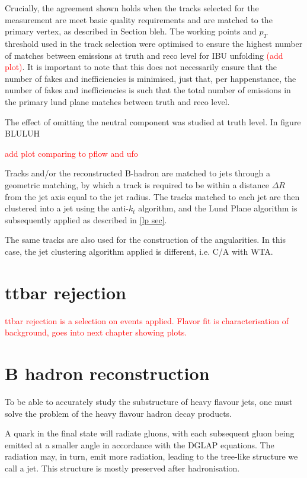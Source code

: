 \documentclass[10pt,a4paper]{book}
\newcommand{\todo}[1]{{\textcolor{red}{#1}}}
\begin{document}
Crucially, the agreement shown holds when the tracks selected for the measurement are meet basic quality requirements and are matched to the primary vertex, as described in Section bleh. The working points and $p_T$ threshold used in the track selection were optimised to ensure the highest number of matches between emissions at truth and reco level for IBU unfolding \todo{(add plot)}. It is important to note that this does not necessarily ensure that the number of fakes and inefficiencies is minimised, just that, per happenstance, the number of fakes and inefficiencies is such that the total number of emissions in the primary lund plane matches between truth and reco level.

The effect of omitting the neutral component was studied at truth level. In figure BLULUH 

\todo{add plot comparing to pflow and ufo}

Tracks and/or the reconstructed B-hadron are matched to jets through a geometric matching, by which a track is required to be within a distance $\Delta R$ from the jet axis equal to the jet radius. The tracks matched to each jet are then clustered into a jet using the anti-$k_t$ algorithm, and the Lund Plane algorithm is subsequently applied as described in \ref{lp sec}.

The same tracks are also used for the construction of the angularities. In this case, the jet clustering algorithm applied is different, i.e. C/A with WTA. 

\section{ttbar rejection}
\todo{ttbar rejection is a selection on events applied. Flavor fit is characterisation of background, goes into next chapter showing plots.}



\section{B hadron reconstruction}
To be able to accurately study the substructure of heavy flavour jets, one must solve the problem of the heavy flavour hadron decay products. 

A quark in the final state will radiate gluons, with each subsequent gluon being emitted at a smaller angle in accordance with the DGLAP equations. The radiation may, in turn, emit more radiation, leading to the tree-like structure we call a jet. This structure is mostly preserved after hadronisation.
\end{document}
